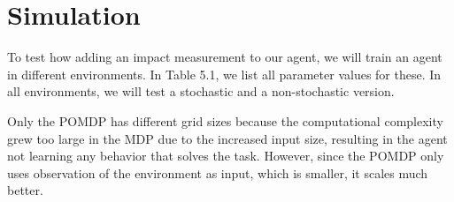 \documentclass[12pt,A4]{report}
\theoremstyle{definition}
\begin{document}


\section{Simulation}
To test how adding an impact measurement to our agent, we will train an agent in different environments. In Table 5.1, we list all parameter values for these. In all environments, we will test a stochastic and a non-stochastic version.

Only the POMDP has different grid sizes because the computational complexity grew too large in the MDP due to the increased input size, resulting in the agent not learning any behavior that solves the task. However, since the POMDP only uses observation of the environment as input, which is smaller, it scales much better.
\end{document}
